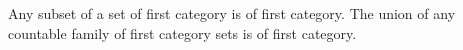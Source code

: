 Any subset of a set of first category is of first category. The union of any countable family of first category sets is of first category.
